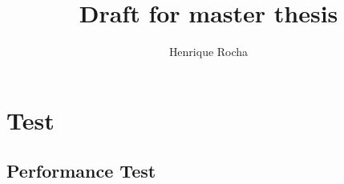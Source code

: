 \documentclass[
10pt, %
a4paper, %
oneside, %
]{scrartcl}
\title{Draft for master thesis} %
\author{Henrique Rocha}
\date{}
\begin{document}
	\maketitle %


	\section{Test}

			
\subsection{Performance Test}

	\begin{center}
		
	\end{center}

	\begin{center}
		
	\end{center}

	\begin{center}
		
	\end{center}
\end{document}
